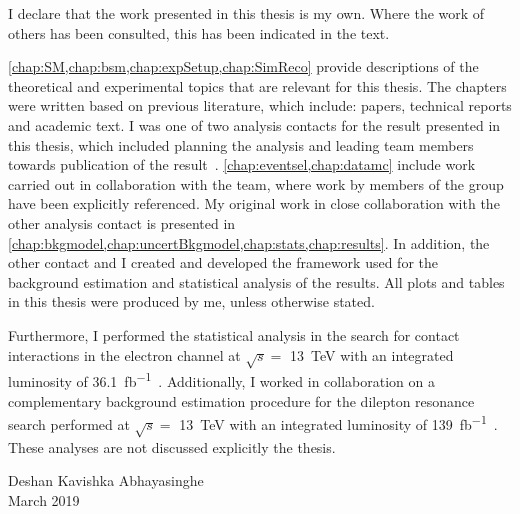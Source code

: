 
\cleardoublepage{}
\begin{declaration}
    I declare that the work presented in this thesis is my own.
    Where the work of others has been consulted, this has been indicated in the text.

    \cref{chap:SM,chap:bsm,chap:expSetup,chap:SimReco} provide descriptions of the theoretical and experimental topics that are relevant for this thesis. The chapters were written based on previous literature, which include: papers, technical reports and academic text. I was one of two analysis contacts for the result presented in this thesis, which included planning the analysis and leading team members towards publication of the result~\cite{Aad:2020otl}. \cref{chap:eventsel,chap:datamc} include work carried out in collaboration with the team, where work by members of the group have been explicitly referenced. My original work in close collaboration with the other analysis contact is presented in \cref{chap:bkgmodel,chap:uncertBkgmodel,chap:stats,chap:results}. In addition, the other contact and I created and developed the framework used for the background estimation and statistical analysis of the results. All plots and tables in this thesis were produced by me, unless otherwise stated. 

    Furthermore, I performed the statistical analysis in the search for contact interactions in the electron channel at $\sqrt{s} = $ \SI{13}{\tera\electronvolt} with an integrated luminosity of \SI{36.1}{\femto\barn^{-1}}~\cite{EXOT-2016-05}. Additionally, I worked in collaboration on a complementary background estimation procedure for the dilepton resonance search performed  at $\sqrt{s} = $ \SI{13}{\tera\electronvolt} with an integrated luminosity of \SI{139}{\femto\barn^{-1}}~\cite{Aad:2019fac}. These analyses are not discussed explicitly the thesis. 
    \vspace*{1.5cm}
    \begin{flushright}
        Deshan Kavishka Abhayasinghe \\
        March 2019
    \end{flushright}
\end{declaration}


